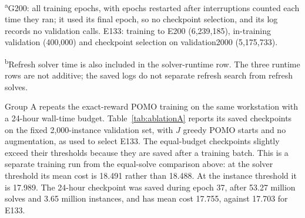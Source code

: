 \documentclass[preprint,12pt,authoryear]{elsarticle}
\DeclareRobustCommand{\zhcap}[1]{{\color{zhc}#1}}
\begin{document}
\begin{table}[!htbp]
\centering
\caption{Training budgets of G200 and E133.\protect\newline\zhcap{G200 与 E133 的训练预算。}}
\label{tab:budget}
\small
{}
\par\smallskip\footnotesize\raggedright \textsuperscript{a}G200: all training epochs, with epochs restarted after interruptions counted each time they ran; it used its final epoch, so no checkpoint selection, and its log records no validation calls. E133: training to E200 (6,239,185), in-training validation (400,000) and checkpoint selection on validation2000 (5,175,733).
\par \textsuperscript{b}Refresh solver time is also included in the solver-runtime row. The three runtime rows are not additive; the saved logs do not separate refresh search from refresh solves.
\end{table}

Group A repeats the exact-reward POMO training on the same workstation with a 24-hour wall-time budget. Table~\ref{tab:ablationA} reports its saved checkpoints on the fixed 2,000-instance validation set, with $J$ greedy POMO starts and no augmentation, as used to select E133. The equal-budget checkpoints slightly exceed their thresholds because they are saved after a training batch. This is a separate training run from the equal-solve comparison above: at the solver threshold its mean cost is 18.491 rather than 18.488. At the instance threshold it is 17.989. The 24-hour checkpoint was saved during epoch 37, after 53.27 million solves and 3.65 million instances, and has mean cost 17.755, against 17.703 for E133.
\end{document}
